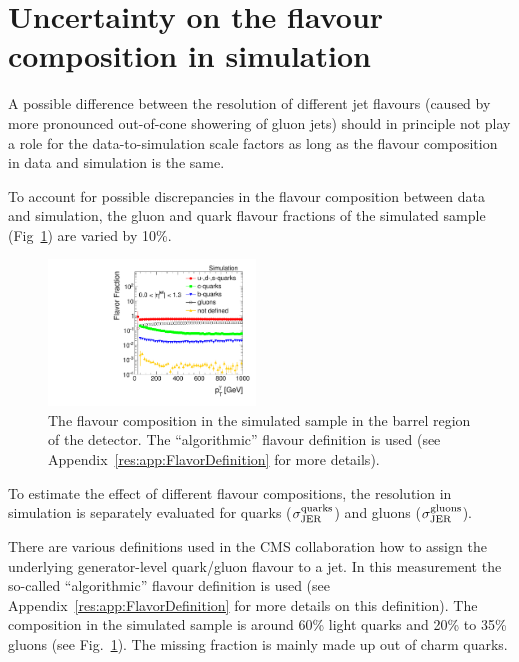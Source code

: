 \section*{Uncertainty on the flavour composition in simulation}
A possible difference between the resolution of different jet flavours (\eg caused by more pronounced out-of-cone showering of gluon jets) should in principle not play a role for the data-to-simulation scale factors \rhores as long as the flavour composition in data and simulation is the same.

To account for possible discrepancies in the flavour composition between data and simulation, the gluon and quark flavour fractions of the simulated sample (Fig~\ref{res:fig:FlavorFraction}) are varied by 10\%.
\begin{figure}[!b]
  \centering
      \includegraphics[width=0.49\textwidth]{figures/resolution/systematicUncertainties/flavorFraction_barrel_algo.pdf}
  \caption{The flavour composition in the simulated \GAMJET sample in the barrel region of the detector. The ``algorithmic'' flavour definition is used (see Appendix~\ref{res:app:FlavorDefinition} for more details).}  
  \label{res:fig:FlavorFraction}
\end{figure}
To estimate the effect of different flavour compositions, the resolution in simulation is separately evaluated for quarks ($\sigma_\mathrm{JER}^\text{quarks}$) and gluons ($\sigma_\mathrm{JER}^\text{gluons}$). 

There are various definitions used in the CMS collaboration how to assign the underlying generator-level quark/gluon flavour to a jet.
In this measurement the so-called ``algorithmic'' flavour definition is used (see Appendix~\ref{res:app:FlavorDefinition} for more details on this definition).
The composition in the simulated \pythia \GAMJET sample is around 60\% light quarks and 20\% to 35\% gluons (see Fig.~\ref{res:fig:FlavorFraction}). 
The missing fraction is mainly made up out of charm quarks. 


